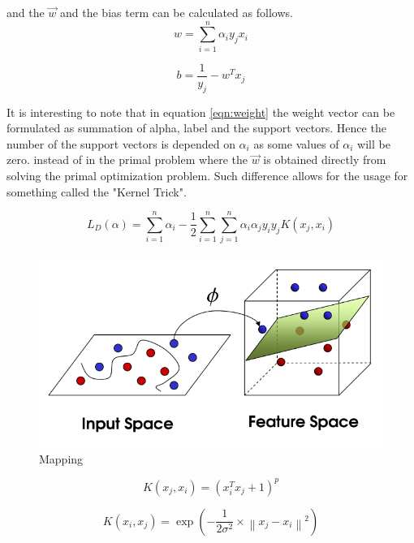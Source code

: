 \documentclass[10pt,twocolumn,letterpaper]{article}
\begin{document}
and the $\overrightarrow{w}$ and the bias term can be calculated as follows. 
\begin{equation}
w=\sum ^{n}_{i=1}\alpha _{i}y_{j}x_{i}
\label{eqn:weight}
\end{equation}

\begin{equation}
b =\dfrac{1}{y_{j}}-w^{T}x_{j}
\end{equation}
 
It is interesting to note that in equation \ref{eqn:weight} the weight vector can be formulated as summation of alpha, label and the support vectors. Hence the number of the support vectors is depended on $\alpha _{i}$ as some values of $\alpha _{i}$ will be zero.
instead of in the primal problem where the $\overrightarrow{w}$ is obtained directly from solving the primal optimization problem. Such difference allows for the usage for something called the "Kernel Trick".
 
\begin{equation}
L_{D}\left( \alpha \right) =\sum ^{n}_{i=1}\alpha _{i}-\dfrac{1}{2}\sum ^{n}_{i=1}\sum ^{n}_{j=1}\alpha _{i}\alpha _{j}y_{i}y_{j}K\left( x_{j},x_{i}\right) 
\label{eqn:lk}
\end{equation} 


\begin{figure}[h!]
  \includegraphics[width=\linewidth]{kernel.png}
  \caption{Mapping}
  \label{fig:kernel}
\end{figure}


\begin{equation}
K\left( x_{j},x_{i}\right) =\left( x_{i}^{T}x_{j}+1\right) ^{p}
\label{eq:polyk}
\end{equation}


\begin{equation}
K\left( x_{i},x_{j}\right) =\exp \left( -\dfrac{1}{2\sigma ^{2}}\times \left\| x_{j}-x_{i}\right\| ^{2}\right) 
\label{eq:rbfk}
\end{equation}
\end{document}
